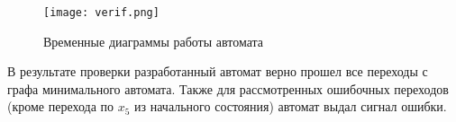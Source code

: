 \documentclass[a4paper,14pt,russian]{extarticle} %
\begin{document}
\begin{figure}[H]
	\centering
	\texttt{[image: verif.png]}
	\caption{Временные диаграммы работы автомата}
	\label{fig:verif}
\end{figure}

В результате проверки разработанный автомат верно прошел все переходы с графа минимального автомата. Также для рассмотренных ошибочных переходов (кроме перехода по \(x_5\) из начального состояния) автомат выдал сигнал ошибки.   
\end{document}
